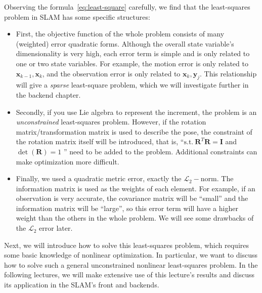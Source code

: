 Observing the formula~\eqref{eq:least-square} carefully, we find that the least-squares problem in SLAM has some specific structures:

\begin{itemize}
	\item First, the objective function of the whole problem consists of many (weighted) error quadratic forms. Although the overall state variable's dimensionality is very high, each error term is simple and is only related to one or two state variables. For example, the motion error is only related to $\mathbf{x}_{k-1}, \mathbf{x}_k$, and the observation error is only related to $\mathbf{x}_k, \mathbf{y}_j$. This relationship will give a \textit{sparse} least-square problem, which we will investigate further in the backend chapter.
	\item Secondly, if you use Lie algebra to represent the increment, the problem is an \textit{unconstrained} least-squares problem. However, if the rotation matrix/transformation matrix is used to describe the pose, the constraint of the rotation matrix itself will be introduced, that is, ``$\mathrm{s.t.}\ \mathbf{R}^T \mathbf{R} = \mathbf{I}$ and $\det (\mathbf{R})=1$ '' need to be added to the problem. Additional constraints can make optimization more difficult.
	\item Finally, we used a quadratic metric error, exactly the $\mathcal{L}_2-$norm. The information matrix is used as the weights of each element. For example, if an observation is very accurate, the covariance matrix will be ``small'' and the information matrix will be ``large'', so this error term will have a higher weight than the others in the whole problem. We will see some drawbacks of the $\mathcal{L}_2$ error later.
\end{itemize}

Next, we will introduce how to solve this least-squares problem, which requires some basic knowledge of nonlinear optimization. In particular, we want to discuss how to solve such a general unconstrained nonlinear least-squares problem. In the following lectures, we will make extensive use of this lecture's results and discuss its application in the SLAM's front and backends.

